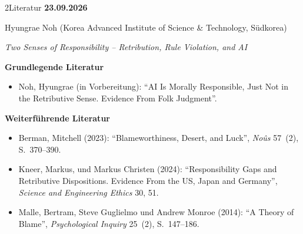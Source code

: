 \documentclass[xcolor=table,9pt,aspectratio=169]{beamer}
\begin{document}
\begin{frame}{\vspace*{10mm}2\hspace*{1em}Literatur}
\textbf{23.09.2026}

\smallskip
Hyungrae Noh (Korea Advanced Institute of Science \& Technology, Südkorea)

\medskip
\textit{Two Senses of Responsibility -- Retribution, Rule Violation, and AI}


\medskip
\textbf{Grundlegende Literatur}
{\footnotesize
\begin{itemize}[label=,leftmargin=2em,itemindent=-2em]
   \item Noh, Hyungrae (in Vorbereitung): \enquote{AI Is Morally Responsible, Just Not in the Retributive Sense. Evidence From Folk Judgment}.
\end{itemize}
}

\medskip
\textbf{Weiterführende Literatur}
{\footnotesize
\begin{itemize}[label=,leftmargin=2em,itemindent=-2em]
   \item Berman, Mitchell (2023): \enquote{Blameworthiness, Desert, and Luck}, \textit{Noûs} 57~(2), S.~370--390.
   \item Kneer, Markus, und Markus Christen (2024): \enquote{Responsibility Gaps and Retributive Dispositions. Evidence From the US, Japan and Germany}, \textit{Science and Engineering Ethics} 30, 51.
   \item Malle, Bertram, Steve Guglielmo und Andrew Monroe (2014): \enquote{A Theory of Blame}, \textit{Psychological Inquiry} 25~(2), S.~147--186.
\end{itemize}
}
\end{frame}
\end{document}
